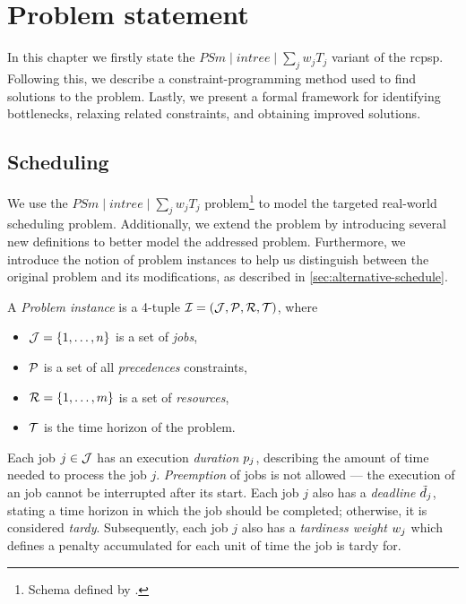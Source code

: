 \chapter{Problem statement} \label{chap:problem-statement}

In this chapter we firstly state the $PSm \;|\; intree \;|\; \sum_{j} w_j T_j$ variant of the \ac{rcpsp}.
Following this, we describe a constraint-programming method used to find solutions to the problem.
Lastly, we present a formal framework for identifying bottlenecks, relaxing related constraints,
and obtaining improved solutions.

\section{Scheduling} \label{sec:scheduling}

We use the $PSm \;|\; intree \;|\; \sum_{j} w_j T_j$ problem\footnote{Schema defined by \citet{BRUCKER1999}.}
to model the targeted real-world scheduling problem.
Additionally, we extend the problem by introducing several new definitions to better model the addressed problem.
Furthermore, we  introduce the notion of problem instances to help us distinguish between the original problem
and its modifications, as described in \cref{sec:alternative-schedule}.

A \emph{Problem instance} is a 4-tuple $\mathcal{I} = (\mathcal{J}, \mathcal{P}, \mathcal{R}, \mathcal{T})$,
where

\begin{itemize}
    \item $\mathcal{J} = \{1, \dots, n\}$ is a set of \emph{jobs},
    \item $\mathcal{P}$ is a set of all \emph{precedences} constraints,
    \item $\mathcal{R} = \{1, \dots, m\}$ is a set of \emph{resources},
    \item $\mathcal{T}$ is the time horizon of the problem.
\end{itemize}

Each job $j \in \mathcal{J}$ has an execution \emph{duration} $p_{j}$,
describing the amount of time needed to process the job $j$.
\emph{Preemption} of jobs is not allowed
--- the execution of an job cannot be interrupted after its start.
Each job $j$ also has a \emph{deadline} $\tilde{d}_{j}$,
stating a time horizon in which the job should be completed;
otherwise, it is considered \emph{tardy}.
Subsequently, each job $j$ also has a \emph{tardiness weight} $w_{j}$
which defines a penalty accumulated for each unit of time the job is tardy for.

